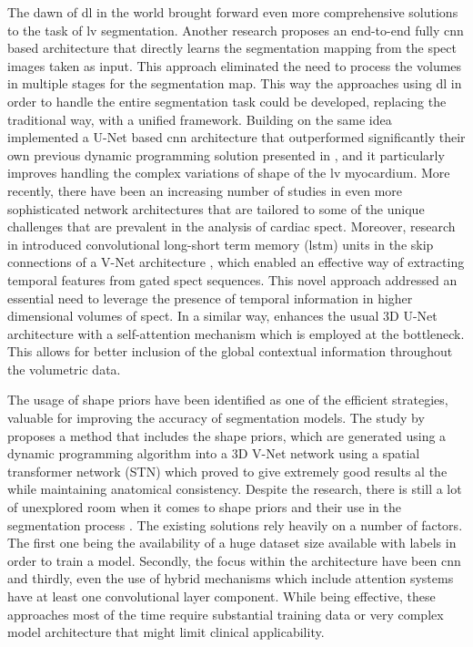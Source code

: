 The dawn of \gls{dl} in the world brought forward even more comprehensive solutions to the task of \gls{lv} segmentation. Another research \cite{Wang2020} proposes an end-to-end fully \gls{cnn} based architecture that directly learns the segmentation mapping from the \gls{spect} images taken as input. This approach eliminated the need to process the volumes in multiple stages for the segmentation map. This way the approaches using \gls{dl} in order to handle the entire segmentation task could be developed, replacing the traditional way, with a unified framework. Building on the same idea \cite{WEN2021166842} implemented a U-Net \cite{RFB15a} based \gls{cnn} architecture that outperformed significantly their own previous dynamic programming solution presented in \cite{tang2017dynamic}, and it particularly improves handling the complex variations of shape of the \gls{lv} myocardium. More recently, there have been an increasing number of studies in even more sophisticated network architectures that are tailored to some of the unique challenges that are prevalent in the analysis of cardiac \gls{spect}. Moreover, research in \cite{zhao2023spatial} introduced convolutional long-short term memory (\gls{lstm}) units in the skip connections of a V-Net architecture \cite{7785132}, which enabled an effective way of extracting temporal features from gated \gls{spect} sequences. This novel approach addressed an essential need to leverage the presence of temporal information in higher dimensional volumes of \gls{spect}. In a similar way, \cite{ZHANG2023107267} enhances the usual 3D U-Net architecture with a self-attention mechanism which is employed at the bottleneck. This allows for better inclusion of the global contextual information throughout the volumetric data.

The usage of shape priors have been identified as one of the efficient strategies, valuable for improving the accuracy of segmentation models. The study by \cite{ZHU2023106954} proposes a method that includes the shape priors, which are generated using a dynamic programming algorithm into a 3D V-Net network using a spatial transformer network (STN) which proved to give extremely good results al the while maintaining anatomical consistency. Despite the research, there is still a lot of unexplored room when it comes to shape priors and their use in the segmentation process \cite{Wang2020}. The existing solutions rely heavily on a number of factors. The first one being the availability of a huge dataset size available with labels in order to train a model. Secondly, the focus within the architecture have been \gls{cnn} and thirdly, even the use of hybrid mechanisms which include attention systems have at least one convolutional layer component. While being effective, these approaches most of the time require substantial training data or very complex model architecture that might limit clinical applicability.

